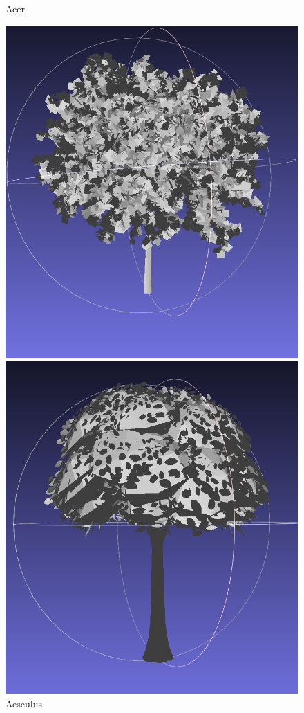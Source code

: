 \documentclass[12pt]{article}
\begin{document}
\begin{figure}[H]
\begin{minipage}{0.24\textwidth}
        \caption{Acer}
    \end{minipage}\hfill
    \begin{minipage}{0.24\textwidth}
        \centering
        \includegraphics[width=\textwidth]{images/aesculus.png}
        \caption{Aesculus}
    \end{minipage}\hfill
    \begin{minipage}{0.24\textwidth}
        \centering
        \includegraphics[width=\textwidth]{images/catalpa.png}

\end{minipage}
\end{figure}
\end{document}
